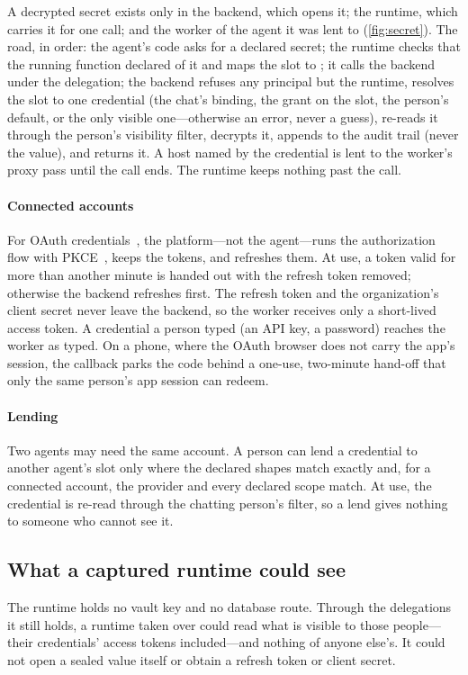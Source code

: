 A decrypted secret exists only in the backend, which opens it; the
runtime, which carries it for one call; and the worker of the agent it
was lent to (\cref{fig:secret}). The road, in order: the agent's code
asks for a declared secret; the runtime checks that the running
function declared  of it and maps the slot to
; it calls the backend under the delegation;
the backend refuses any principal but the runtime, resolves the slot to
one credential (the chat's binding, the grant on the slot, the person's
default, or the only visible one---otherwise an error, never a guess),
re-reads it through the person's visibility filter, decrypts it,
appends  to the audit trail (never the value), and
returns it. A host named by the credential is lent to the worker's
proxy pass until the call ends. The runtime keeps nothing past the call.

\paragraph{Connected accounts}
For OAuth credentials~\cite{rfc6749}, the platform---not the agent---runs
the authorization flow with PKCE~\cite{rfc7636}, keeps the tokens, and
refreshes them. At use, a token valid for more than another minute is
handed out with the refresh token removed; otherwise the backend
refreshes first. The refresh token and the organization's client secret
never leave the backend, so the worker receives only a short-lived
access token. A credential a person typed (an API key, a password)
reaches the worker as typed. On a phone, where the OAuth browser does
not carry the app's session, the callback parks the code behind a
one-use, two-minute hand-off that only the same person's app session
can redeem.

\paragraph{Lending}
Two agents may need the same account. A person can lend a credential to
another agent's slot only where the declared shapes match exactly and,
for a connected account, the provider and every declared scope match.
At use, the credential is re-read through the chatting person's filter,
so a lend gives nothing to someone who cannot see it.

\subsection{What a captured runtime could see}

The runtime holds no vault key and no database route. Through the
delegations it still holds, a runtime taken over could read what is
visible to those people---their credentials' access tokens
included---and nothing of anyone else's. It could not open a sealed
value itself or obtain a refresh token or client secret.
